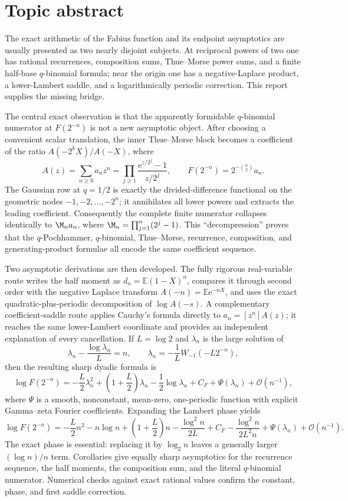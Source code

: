 \documentclass[11pt,oneside]{article}
\theoremstyle{definition}
\theoremstyle{remark}
\newcommand{\e}{\mathrm e}
\newcommand{\E}{\mathbb E}
\newcommand{\bigO}{\mathcal O}
\begin{document}
\section*{Topic abstract}
The exact arithmetic of the Fabius function and its endpoint asymptotics are usually presented
as two nearly disjoint subjects.  At reciprocal powers of two one has rational recurrences,
composition sums, Thue--Morse power sums, and a finite half-base $q$-binomial formula; near the
origin one has a negative-Laplace product, a lower-Lambert saddle, and a logarithmically
periodic correction.  This report supplies the missing bridge.

The central exact observation is that the apparently formidable $q$-binomial numerator at
$F(2^{-n})$ is not a new asymptotic object.  After choosing a convenient scalar translation,
the inner Thue--Morse block becomes a coefficient of the ratio
$A(-2^kX)/A(-X)$, where
\[
 A(z)=\sum_{n\ge0}a_nz^n
     =\prod_{j\ge1}\frac{\e^{z/2^j}-1}{z/2^j},
 \qquad
 F(2^{-n})=2^{-\binom n2}a_n.
\]
The Gaussian row at $q=1/2$ is exactly the divided-difference functional on the geometric
nodes $-1,-2,\ldots,-2^n$; it annihilates all lower powers and extracts the leading
coefficient.  Consequently the complete finite numerator collapses identically to
$\M_na_n$, where $\M_n=\prod_{j=1}^n(2^j-1)$.  This ``decompression'' proves that the
$q$-Pochhammer, $q$-binomial, Thue--Morse, recurrence, composition, and generating-product
formulae all encode the same coefficient sequence.

Two asymptotic derivations are then developed.  The fully rigorous real-variable route writes
the half moment as $d_n=\E(1-X)^n$, compares it through second order with the negative
Laplace transform $A(-n)=\E\e^{-nX}$, and uses the exact quadratic-plus-periodic
decomposition of $\log A(-s)$.  A complementary coefficient-saddle route applies Cauchy's
formula directly to $a_n=[z^n]A(z)$; it reaches the same lower-Lambert coordinate and provides
an independent explanation of every cancellation.  If $L=\log2$ and $\lambda_n$ is the
large solution of
\[
 \lambda_n-\frac{\log\lambda_n}{L}=n,
 \qquad
 \lambda_n=-\frac1L W_{-1}(-L2^{-n}),
\]
then the resulting sharp dyadic formula is
\[
 \log F(2^{-n})=
 -\frac L2\lambda_n^2+
 \left(1+\frac L2\right)\lambda_n-\frac12\log\lambda_n
 +C_F+\Psi(\lambda_n)+\bigO(n^{-1}),
\]
where $\Psi$ is a smooth, nonconstant, mean-zero, one-periodic function with explicit
Gamma--zeta Fourier coefficients.  Expanding the Lambert phase yields
\[
 \log F(2^{-n})=
 -\frac L2n^2-n\log n+\left(1+\frac L2\right)n
 -\frac{\log^2n}{2L}+C_F-
 \frac{\log^2n}{2L^2n}+\Psi(\lambda_n)+\bigO(n^{-1}).
\]
The exact phase is essential: replacing it by $\log_2n$ leaves a generally larger
$(\log n)/n$ term.  Corollaries give equally sharp asymptotics for the recurrence sequence,
the half moments, the composition sum, and the literal $q$-binomial numerator.  Numerical
checks against exact rational values confirm the constant, phase, and first saddle
correction.
\end{document}

